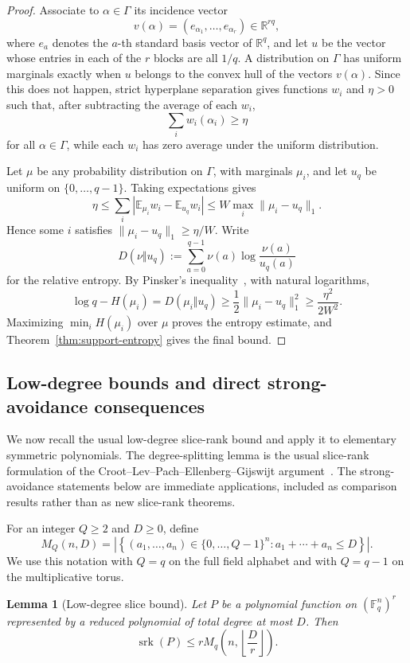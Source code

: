 \documentclass[10pt,a4paper]{amsart}
\newtheorem{lemma}[theorem]{Lemma}
\theoremstyle{definition}
\newcommand{\F}{\mathbb F}
\newcommand{\srk}{\operatorname{srk}}
\newcommand{\1}{\mathbf 1}
\begin{document}
\begin{proof}
Associate to $\alpha\in\Gamma$ its incidence vector
\[
 v(\alpha)=(e_{\alpha_1},\ldots,e_{\alpha_r})\in\mathbb R^{rq},
\]
where $e_a$ denotes the $a$-th standard basis vector of $\mathbb R^q$, and let $u$ be the vector whose entries in each of the $r$ blocks are all $1/q$.  A distribution on $\Gamma$ has uniform marginals exactly when $u$ belongs to the convex hull of the vectors $v(\alpha)$.  Since this does not happen, strict hyperplane separation gives functions $w_i$ and $\eta>0$ such that, after subtracting the average of each $w_i$,
\[
 \sum_iw_i(\alpha_i)\ge\eta
\]
for all $\alpha\in\Gamma$, while each $w_i$ has zero average under the uniform distribution.

Let $\mu$ be any probability distribution on $\Gamma$, with marginals $\mu_i$, and let $u_q$ be uniform on $\{0,\ldots,q-1\}$.  Taking expectations gives
\[
 \eta\le\sum_i\left|\mathbb E_{\mu_i}w_i-\mathbb E_{u_q}w_i\right|
 \le W\max_i\lVert\mu_i-u_q\rVert_1.
\]
Hence some $i$ satisfies $\lVert\mu_i-u_q\rVert_1\ge\eta/W$.  Write
\[
 D(\nu\Vert u_q):=\sum_{a=0}^{q-1}\nu(a)\log\frac{\nu(a)}{u_q(a)}
\]
for the relative entropy.  By Pinsker's inequality~\cite{CoverThomas}, with natural logarithms,
\[
 \log q-H(\mu_i)=D(\mu_i\Vert u_q)
 \ge\frac12\lVert\mu_i-u_q\rVert_1^2
 \ge\frac{\eta^2}{2W^2}.
\]
Maximizing $\min_iH(\mu_i)$ over $\mu$ proves the entropy estimate, and Theorem~\ref{thm:support-entropy} gives the final bound.
\end{proof}


\subsection{Low-degree bounds and direct strong-avoidance consequences}
We now recall the usual low-degree slice-rank bound and apply it to elementary symmetric polynomials. The degree-splitting lemma is the usual slice-rank formulation of the Croot--Lev--Pach--Ellenberg--Gijswijt argument~\cite{CrootLevPach,EllenbergGijswijt,TaoBlog}.  The strong-avoidance statements below are immediate applications, included as comparison results rather than as new slice-rank theorems.

For an integer $Q\ge2$ and $D\ge0$, define
\[
 M_Q(n,D)=
 \left|\left\{(a_1,\ldots,a_n)\in\{0,\ldots,Q-1\}^n:
 a_1+\cdots+a_n\le D\right\}\right|.
\]
We use this notation with $Q=q$ on the full field alphabet and with $Q=q-1$ on the multiplicative torus.

\begin{lemma}[Low-degree slice bound]\label{lem:degree-slice}
Let $P$ be a polynomial function on $(\F_q^n)^r$ represented by a reduced polynomial of total degree at most $D$.  Then
\[
 \srk(P)\le rM_q\left(n,\left\lfloor\frac Dr\right\rfloor\right).
\]
\end{lemma}
\end{document}
